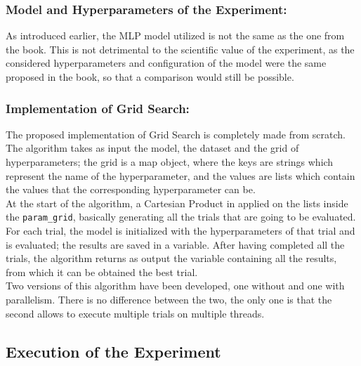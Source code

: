 \subsubsection{Model and Hyperparameters of the Experiment:}
As introduced earlier, the MLP model utilized is not the same as the one from the book. This is not detrimental to the scientific value of the experiment, as the considered hyperparameters and configuration of the model were the same proposed in the book, so that a comparison would still be possible.

\subsubsection{Implementation of Grid Search:}
The proposed implementation of Grid Search is completely made from scratch.
The algorithm takes as input the model, the dataset and the grid of hyperparameters; the grid is a map object, where the keys are strings which represent the name of the hyperparameter, and the values are lists which contain the values that the corresponding hyperparameter can be.
\\[0.3cm]At the start of the algorithm, a Cartesian Product in applied on the lists inside the \texttt{param\_grid}, basically generating all the trials that are going to be evaluated.
For each trial, the model is initialized with the hyperparameters of that trial and is evaluated; the results are saved in a variable.
After having completed all the trials, the algorithm returns as output the variable containing all the results, from which it can be obtained the best trial.
\\[0.3cm]Two versions of this algorithm have been developed, one without and one with parallelism. There is no difference between the two, the only one is that the second allows to execute multiple trials on multiple threads.

\subsection{Execution of the Experiment}

